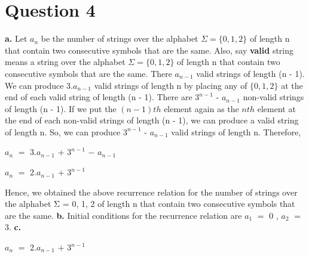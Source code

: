 \documentclass[11pt]{article}
\begin{document}
\section*{Question 4}
\textbf{a.} \newline \newline 
\indent Let $a_{n}$ be the number of strings over the alphabet $\Sigma = \{0,1,2\}$ of length n that contain two consecutive symbols that are the same.\newline
Also, say \textbf{valid} string means a string over the alphabet $\Sigma = \{0,1,2\}$ of length n that contain two consecutive symbols that are the same. \newline \newline
There $a_{n-1}$ valid strings of length (n - 1). We can produce 3.$a_{n-1}$ valid strings of length n by placing any of $\{0,1,2\}$ at the end of each valid string of length (n - 1). \newline \newline
There are $3^{n-1}$ - $a_{n-1}$ non-valid strings of length (n - 1). If we put the $(n-1)th$ element again as the $nth$ element at the end of each non-valid strings of length (n - 1), we can produce a valid string of length n. So, we can produce $3^{n-1}$ - $a_{n-1}$ valid strings of length n. \newline \newline
Therefore, 
\begin{center}
    $a_n$ $=$  $3.a_{n-1}$ $+$ $3^{n-1}$ $-$ $a_{n-1}$
\end{center}
\begin{center}
    $a_n$ $=$ $2.a_{n-1}$ $+$ $3^{n-1}$
\end{center}
Hence, we obtained the above recurrence relation for the number of strings over the alphabet Σ = {0, 1, 2} of length n
that contain two consecutive symbols that are the same. \newline \newline
\newline \textbf{b.} \newline \newline
\indent Initial conditions for the recurrence relation are $a_1$ $=$ $0$ , $a_2$ $=$ $3$. \newline \newline
\textbf{c.} \newline \newline
\begin{center}
    $a_n$ $=$ $2.a_{n-1}$ $+$ $3^{n-1}$
\end{center}
\end{document}
